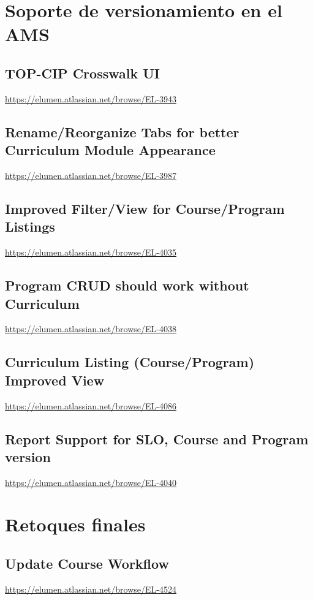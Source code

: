 \section{Soporte de versionamiento en el AMS}
\subsection{TOP-CIP Crosswalk UI}
\url{https://elumen.atlassian.net/browse/EL-3943}

\subsection{Rename/Reorganize Tabs for better Curriculum Module Appearance}
\url{https://elumen.atlassian.net/browse/EL-3987}

\subsection{Improved Filter/View for Course/Program Listings}
\url{https://elumen.atlassian.net/browse/EL-4035}

\subsection{Program CRUD should work without Curriculum}
\url{https://elumen.atlassian.net/browse/EL-4038}

\subsection{Curriculum Listing (Course/Program) Improved View}
\url{https://elumen.atlassian.net/browse/EL-4086}

\subsection{Report Support for SLO, Course and Program version}
\url{https://elumen.atlassian.net/browse/EL-4040}

\section{Retoques finales}
\subsection{Update Course Workflow}
\url{https://elumen.atlassian.net/browse/EL-4524}
